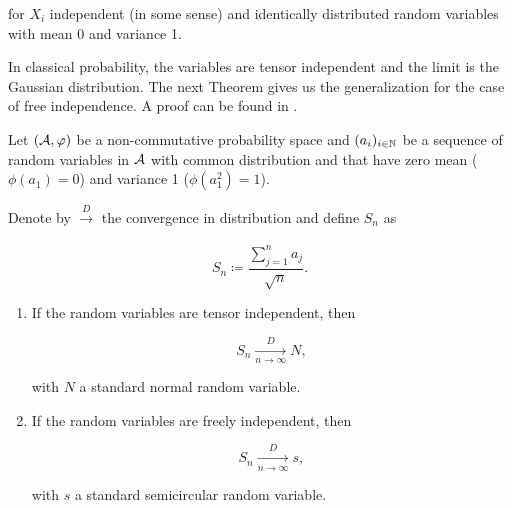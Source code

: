     \noindent for $X_i$ independent (in some sense) and identically distributed random variables with mean 0 and variance 1.

    In classical probability, the variables are tensor independent and the limit is the Gaussian distribution. The next Theorem gives us the generalization for the case of free independence. A proof can be found in \cite{book:nica_speicher}.

    \begin{theorem}
        Let $(\mathcal A,\varphi)$ be a non-commutative probability space and $(a_i)_{i\in \mathbb N}$ be a sequence of random variables in $\mathcal A$ with common distribution and that have zero mean ($\phi(a_1)=0$) and variance 1 ($\phi(a_1^2)=1$). 
        
        Denote by $\xrightarrow[]{D}$ the convergence in distribution and define $S_n$ as

        \[ S_n \coloneqq \frac{\sum_{j=1}^n a_j}{\sqrt{n}}.\]
        \begin{enumerate}
            \item If the random variables are tensor independent, then 
                
            \begin{equation*}
            S_n \xrightarrow[n\to\infty]{D} N,        
            \end{equation*}

            \noindent with $N$ a standard normal random variable.
            
            
            

            

            
            \item If the random variables are freely independent, then 
                
            \begin{equation*}
            S_n \xrightarrow[n\to\infty]{D} s,        
            \end{equation*}

            \noindent with $s$ a standard semicircular random variable.
        \end{enumerate}
    \end{theorem}

